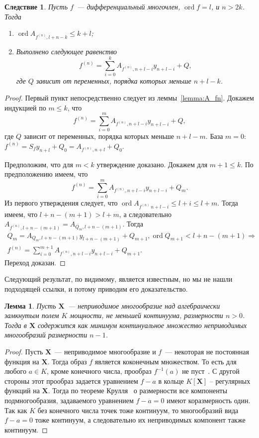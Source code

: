 \documentclass[16pt]{article}
\DeclareMathOperator{\ord}{ord}
\renewcommand{\le}{\leqslant} %
\theoremstyle{plain}
\newtheorem{lemma}[theorem]{Лемма}
\newtheorem{corollary}[theorem]{Следствие}
\theoremstyle{definition}
\theoremstyle{remark}
\begin{document}
\begin{corollary}\label{corollary:deriv_equal}
Пусть $f$~--- дифференциальный многочлен, $\ord f =l$, и $n>2k$.
Тогда
\begin{enumerate}
\item $\ord A_{f^{(n)},l+n-k}\leqslant k+l$;

\item Выполнено следующее равенство
$$
f^{(n)}=\sum\limits_{i=0}^{k} A_{f^{(n)},n+l -i}y_{n+l -i} + Q,
$$
где $Q$  зависит от переменных, порядка которых меньше $n+l-k$.
\end{enumerate}
\end{corollary}
\begin{proof} Первый пункт непосредственно следует из леммы~\ref{lemma:A_fn}. Докажем индукцией по $m\le k$, что
$$
f^{(n)}=\sum\limits_{i=0}^{m} A_{f^{(n)},n+l -i}y_{n+l -i} + Q,
$$
где $Q$  зависит от переменных, порядка которых меньше $n+l-m$. База $m = 0$: $f^{(n)}=S_fy_{n+l}+Q_0=A_{f^{(n)}, n + l}+Q_0$.

Предположим, что для $m<k$ утверждение доказано. Докажем для $m+1\le k$. По предположению имеем, что
$$
f^{(n)}=\sum\limits_{i=0}^{m} A_{f^{(n)},n+l -i}y_{n+l -i} + Q_m.
$$
Из первого утверждения следует, что $\ord A_{f^{(n)}\,n+l -i}\le l+i\le l+m$. Тогда имеем, что $l+n-(m+1)>l+m$, а следовательно $A_{f^{(n)}, l+n-(m+1)} = A_{Q_{m}, l+n-(m+1)}$.
Тогда
\begin{gather*}Q_{m}=A_{Q_{m}, l+n-(m+1)}y_{l+n-(m+1)}+Q_{m+1},\ord Q_{m+1}<l+n-(m+1)\Rightarrow \\ f^{(n)}=\sum\limits_{i=0}^{m+1} A_{f^{(n)},n+l -i}y_{n+l -i} + Q_{m+1}.
\end{gather*}
Переход доказан.

\end{proof}
Следующий результат, по видимому, является известным, но мы не нашли
подходящей ссылки, и потому приводим его доказательство.

\begin{lemma} \label{lemma:sb_vr_cntm}
Пусть $\mathbf{X}$~--- неприводимое многообразие над алгебраически замкнутым полем $K$
мощности, не меньшей континуума, размерности $n>0$. Тогда в
$\mathbf{X}$ содержится как минимум континуальное множество
неприводимых многообразий размерности $n-1$.
\end{lemma}

\begin{proof}
Пусть $\mathbf{X}$~--- неприводимое многообразие и $f$~--- некоторая
не постоянная функция на $\mathbf{X}$. Тогда образ $f$ является
коконечным множеством. То есть для любого $a\in K$, кроме конечного
числа, прообраз $f^{-1}(a)$ не пуст~\cite[Глава 2, параграф 3, упр 3.19]{Hartshorn}. С другой стороны
этот прообраз задается уравнением $f-a$ в кольце $K[\mathbf{X}]$ --
регулярных функций на $\mathbf{X}$. Тогда по теореме Крулля~\cite[Chapter~5,
Section~12, Theorem~18]{Matsumura} о размерности все
компоненты подмногообразия, задаваемого уравнением $f-a=0$ имеют
коразмерность один. Так как $K$ без конечного числа точек тоже
континуум, то многообразий вида $f-a=0$ тоже континуум, а следовательно их
неприводимых компонент также континуум.
\end{proof}
\end{document}
